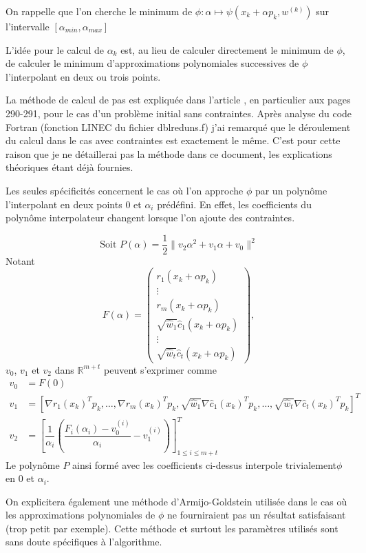 \documentclass[a4paper,11pt]{article}
\newcommand{\hc}{\hat{c}}
\numberwithin{equation}{section}
\begin{document}
On rappelle que l'on cherche le minimum de $\phi: \alpha \mapsto \psi(x_{k}+\alpha p_{k},w^{(k)})$ sur l'intervalle $[\alpha_{min},\alpha_{max}]$

L'idée pour le calcul de $\alpha_{k}$ est, au lieu de calculer directement le minimum de $\phi$, de calculer le minimum d'approximations polynomiales successives de $\phi$ l'interpolant en deux ou trois points. 

La méthode de calcul de pas est expliquée dans l'article \cite{lindstromwedin1984}, en particulier aux pages 290-291, pour le cas d'un problème initial sans contraintes. Après analyse du code Fortran (fonction LINEC du fichier dblreduns.f) j'ai remarqué que le déroulement du calcul dans le cas avec contraintes est exactement le même. C'est pour cette raison que je ne détaillerai pas la méthode dans ce document, les explications théoriques étant déjà fournies.


Les seules spécificités concernent le cas où l'on approche $\phi$ par un polynôme l'interpolant en deux points $0$ et $\alpha_{i}$ prédéfini. En effet, les coefficients du polynôme interpolateur changent lorsque l'on ajoute des contraintes.

$$\text{Soit }P(\alpha) = \dfrac{1}{2}\|v_2\alpha^2 + v_1\alpha + v_0\|^2$$
Notant
$$
F(\alpha) = \begin{pmatrix}
r_1(x_{k}+\alpha p_{k}) \\
\vdots \\
r_m(x_{k}+\alpha p_{k}) \\
\sqrt{\hat{w}_1}\hc_1(x_{k}+\alpha p_{k}) \\
\vdots \\
\sqrt{\hat{w}_t}\hc_t(x_{k}+\alpha p_{k})
\end{pmatrix},
$$
$v_0$, $v_1$ et $v_2$ dans $\mathbb{R}^{m+t}$ peuvent s'exprimer comme
\begin{align*} 
v_0 &= F(0) \\
v_1 &= \left[\nabla r_1(x_{k})^Tp_{k},\ldots, \nabla r_m(x_{k})^Tp_{k}, \sqrt{\hat{w}_1}\nabla \hc_1(x_{k})^Tp_{k}, \ldots, \sqrt{\hat{w}_t}\nabla \hc_t(x_{k})^Tp_{k} \right]^T\\
v_2 &= \left[ \dfrac{1}{\alpha_i}\left( \dfrac{F_i(\alpha_i) - v_0^{(i)}}{\alpha_i} - v_1^{(i)}\right)\right]_{1 \leq i \leq m+t}^T
\end{align*}
Le polynôme $P$ ainsi formé avec les coefficients ci-dessus interpole trivialement$\phi$ en $0$ et $\alpha_i$.

On explicitera également une méthode d'Armijo-Goldstein utilisée dans le cas où les approximations polynomiales de $\phi$ ne fourniraient pas un résultat satisfaisant (trop petit par exemple). Cette méthode et surtout les paramètres utilisés sont sans doute spécifiques à l'algorithme. 
\end{document}
